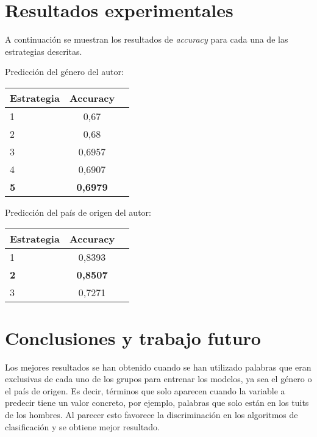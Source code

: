 \documentclass[11pt,a4paper]{article}
\begin{document}
\section{Resultados experimentales}

A continuación se muestran los resultados de \textit{accuracy} para cada una de las estrategias descritas.

Predicción del género del autor:

\begin{table}[htbp]
\begin{center}
\begin{tabular}[t]{|l |c |r|}
\hline
Estrategia & Accuracy \\
\hline \hline
1 & 0,67 \\ \hline
2 & 0,68 \\ \hline
3 & 0,6957 \\ \hline
4 & 0,6907 \\ \hline
\textbf{5} & \textbf{0,6979} \\ \hline
\end{tabular}
\label{tabla:sencilla}
\end{center}
\end{table}


Predicción del país de origen del autor:

\begin{table}[htbp]
\begin{center}
\begin{tabular}[t]{|l |c |r|}
\hline
Estrategia & Accuracy \\
\hline \hline
1 & 0,8393 \\ \hline
\textbf{2} & \textbf{0,8507} \\ \hline
3 & 0,7271 \\ \hline
\end{tabular}
\label{tabla:sencilla}
\end{center}
\end{table}


\section{Conclusiones y trabajo futuro}

Los mejores resultados se han obtenido cuando se han utilizado palabras que eran exclusivas de cada uno de los grupos para entrenar los modelos, ya sea el género o el país de origen. Es decir, términos que solo aparecen cuando la variable a predecir tiene un valor concreto, por ejemplo, palabras que solo están en los tuits de los hombres. Al parecer esto favorece la discriminación en los algoritmos de clasificación y se obtiene mejor resultado.
\end{document}
